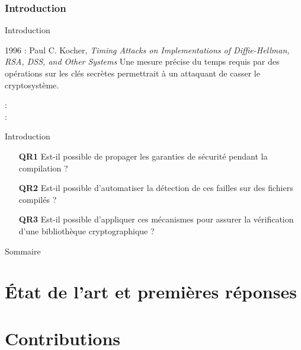 \documentclass{backend/backend}
\begin{document}
\begin{frame}
    \titlepage
\end{frame}

\section*{Introduction}
\showtoctrue %

\begin{frame}{Introduction}
    
    \pause
    \begin{block}{1996 : Paul C. Kocher, \textit{Timing Attacks on Implementations of Diffie-Hellman, RSA, DSS, and Other Systems} }
        Une mesure précise du temps requis par des opérations sur les clés secrètes permettrait à un attaquant de casser le cryptosystème.
    \end{block}

     : \citeauthor{270176} \\
     : \citeauthor{stillPractical} 
\end{frame}

\begin{frame}{Introduction}
    \begin{enumerate}
        \item[\textbf{QR1}] Est-il possible de propager les garanties de sécurité pendant la compilation ?
        \item[\textbf{QR2}] Est-il possible d'automatiser la détection de ces failles sur des fichiers compilés ?
        \item[\textbf{QR3}] Est-il possible d'appliquer ces mécanismes pour assurer la vérification d'une bibliothèque cryptographique ?
    \end{enumerate}
\end{frame}

\begin{frame}{Sommaire}

        \small
        \tableofcontents

\end{frame}



\part{État de l'art et premières réponses}


\part{Contributions}
\end{document}
